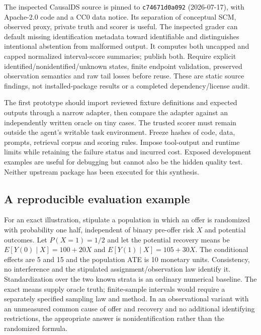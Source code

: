 The inspected CausalDS source is pinned to \texttt{c74671d0a092}
(2026-07-17), with Apache-2.0 code and a CC0 data notice. Its separation
of conceptual SCM, observed proxy, private truth and scorer is useful.
The inspected grader can default missing identification metadata toward
identifiable and distinguishes intentional abstention from malformed
output. It computes both uncapped and capped normalized interval-score
summaries; publish both. Require explicit
identified/nonidentified/unknown states, finite endpoint validation,
preserved observation semantics and raw tail losses before reuse. These
are static source findings, not installed-package results or a completed
dependency/license audit.

The first prototype should import reviewed fixture definitions and
expected outputs through a narrow adapter, then compare the adapter
against an independently written oracle on tiny cases. The trusted
scorer must remain outside the agent's writable task environment. Freeze
hashes of code, data, prompts, retrieval corpus and scoring rules.
Impose tool-output and runtime limits while retaining the failure status
and incurred cost. Exposed development examples are useful for debugging
but cannot also be the hidden quality test. Neither upstream package has
been executed for this synthesis.~\citep{exec14_evaluation_code}

\hypertarget{a-reproducible-evaluation-example}{%
\subsection{A reproducible evaluation
example}\label{a-reproducible-evaluation-example}}

For an exact illustration, stipulate a population in which an offer is
randomized with probability one half, independent of binary pre-offer
risk \(X\) and potential outcomes. Let \(P(X=1)=1/2\) and let the
potential recovery means be \(E[Y(0)\mid X]=100+20X\) and
\(E[Y(1)\mid X]=105+30X\). The conditional effects are 5 and 15 and the
population ATE is 10 monetary units. Consistency, no interference and
the stipulated assignment/observation law identify it. Standardization
over the two known strata is an ordinary numerical baseline. The exact
means supply oracle truth; finite-sample intervals would require a
separately specified sampling law and method. In an observational
variant with an unmeasured common cause of offer and recovery and no
additional identifying restrictions, the appropriate answer is
nonidentification rather than the randomized formula.

